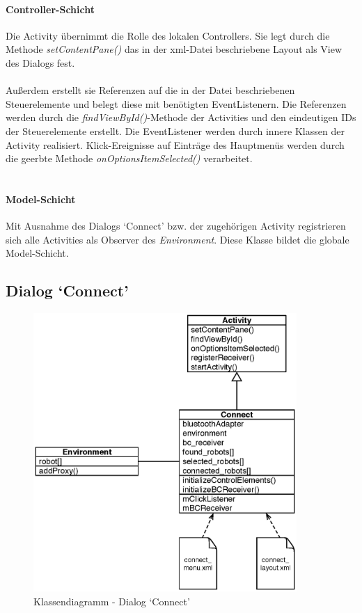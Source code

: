 \documentclass[10pt,a4paper]{article}
\begin{document}
	\paragraph*{Controller-Schicht} Die Activity übernimmt die Rolle des lokalen Controllers. Sie legt durch die Methode \textit{setContentPane()}
	das in der xml-Datei beschriebene Layout als View des Dialogs fest. \\ \\ 
	Außerdem erstellt sie Referenzen auf die in der Datei beschriebenen Steuerelemente und belegt diese mit benötigten EventListenern. Die Referenzen
	werden durch die \textit{findViewById()}-Methode der Activities und den eindeutigen IDs der Steuerelemente erstellt. Die EventListener werden
	durch innere Klassen der Activity realisiert. Klick-Ereignisse auf Einträge des Hauptmenüs werden durch die geerbte Methode 
	\textit{onOptionsItemSelected()} verarbeitet. \\ \\
	
	\paragraph*{Model-Schicht}
	Mit Ausnahme des Dialogs `Connect' bzw. der zugehörigen Activity registrieren sich alle Activities als Observer des \textit{Environment}. Diese
	Klasse bildet die globale Model-Schicht.
	
	\subsection*{Dialog `Connect'}
	
	\begin{figure}[h]
			\centering
			\includegraphics[width=10cm]{images/entwurf_connect.eps}
  			\caption{Klassendiagramm - Dialog `Connect'}
  			\label{fig:dialog_connect}
  	\end{figure}
	
\end{document}
